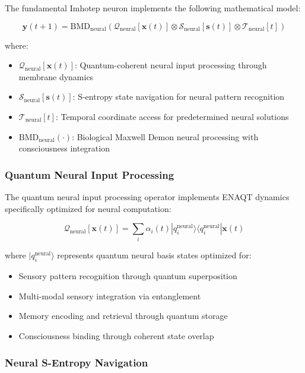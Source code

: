 \documentclass[12pt,a4paper]{article}
\theoremstyle{remark}
\begin{document}
The fundamental Imhotep neuron implements the following mathematical model:

\begin{equation}
\mathbf{y}(t+1) = \text{BMD}_{\text{neural}}\left(\mathcal{Q}_{\text{neural}}[\mathbf{x}(t)] \otimes \mathcal{S}_{\text{neural}}[\mathbf{s}(t)] \otimes \mathcal{T}_{\text{neural}}[t]\right)
\end{equation}

where:
\begin{itemize}
\item $\mathcal{Q}_{\text{neural}}[\mathbf{x}(t)]$: Quantum-coherent neural input processing through membrane dynamics
\item $\mathcal{S}_{\text{neural}}[\mathbf{s}(t)]$: S-entropy state navigation for neural pattern recognition
\item $\mathcal{T}_{\text{neural}}[t]$: Temporal coordinate access for predetermined neural solutions
\item $\text{BMD}_{\text{neural}}(\cdot)$: Biological Maxwell Demon neural processing with consciousness integration
\end{itemize}

\subsubsection{Quantum Neural Input Processing}

The quantum neural input processing operator implements ENAQT dynamics specifically optimized for neural computation:

\begin{equation}
\mathcal{Q}_{\text{neural}}[\mathbf{x}(t)] = \sum_i \alpha_i(t) |q_i^{\text{neural}}\rangle \langle q_i^{\text{neural}}| \mathbf{x}(t)
\end{equation}

where $|q_i^{\text{neural}}\rangle$ represents quantum neural basis states optimized for:
\begin{itemize}
\item Sensory pattern recognition through quantum superposition
\item Multi-modal sensory integration via entanglement
\item Memory encoding and retrieval through quantum storage
\item Consciousness binding through coherent state overlap
\end{itemize}

\subsubsection{Neural S-Entropy Navigation}
\end{document}
